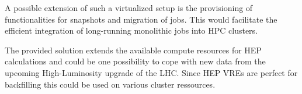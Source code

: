 A possible extension of such a virtualized setup is the provisioning of functionalities
for snapshots and migration of jobs. This would facilitate the efficient integration of
long-running monolithic jobs into HPC clusters.

The provided solution extends the available compute resources for HEP calculations
and could be one possibility to cope with new data from the upcoming High-Luminosity
upgrade of the LHC. Since HEP VREs are perfect for backfilling this could be used on various
cluster ressources.











%
%


